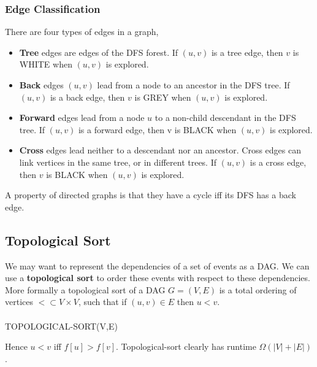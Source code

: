 \documentclass{article}
\begin{document}
        \subsubsection{Edge Classification}
            There are four types of edges in a graph,
            \begin{itemize}
                \item \textbf{Tree} edges are edges of the DFS forest. If $(u,v)$ is a tree edge, then $v$ is WHITE when $(u,v)$ is explored.
                \item \textbf{Back} edges $(u,v)$ lead from a node to an ancestor in the DFS tree. If $(u, v)$ is a back edge, then $v$ is GREY when $(u, v)$ is explored.
                \item \textbf{Forward} edges lead from a node $u$ to a non-child descendant in the DFS tree. If $(u, v)$ is a forward edge, then v is BLACK when $(u, v)$ is explored.
                \item \textbf{Cross} edges lead neither to a descendant nor an ancestor. Cross edges can link vertices in the same tree, or in different trees. If $(u, v)$ is a cross edge, then $v$ is BLACK when $(u, v)$ is explored.
            \end{itemize}
            A property of directed graphs is that they have a cycle iff its DFS has a back edge.
    \subsection{Topological Sort}
        We may want to represent the dependencies of a set of events as a DAG. We can use a \textbf{topological sort} to order these events with respect to these dependencies. More formally a topological sort of a DAG $G = (V,E)$ is a total ordering of vertices $< \subset V \times V$, such that if $(u,v) \in E$ then $u < v$. \\ \\
        TOPOLOGICAL-SORT(V,E)
        \begin{algorithmic}[1]
        \end{algorithmic}
        Hence $u < v$ iff $f[u] > f[v]$. Topological-sort clearly has runtime $\Omega(|V| + |E|)$.
\end{document}
